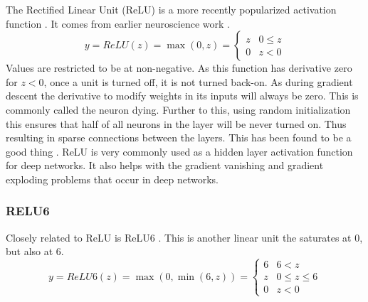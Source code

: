 \documentclass[12pt,parskip]{komatufte}
\begin{document}
The Rectified Linear Unit (ReLU) is a more recently popularized activation function .
It comes from earlier neuroscience work .
\begin{equation}
y=ReLU(z)=\max \left( 0, z \right)=\begin{cases}
z & 0\le z\\
0 & z<0
\end{cases}
\end{equation}
Values are restricted to be at non-negative.
As this function has derivative zero for $z<0$, once a unit is turned off, it is not turned back-on.
As during gradient descent the derivative to modify weights in its inputs will always be zero.
This is commonly called the neuron dying.
Further to this, using random initialization this ensures that half of all neurons in the layer will be never turned on.
Thus resulting in sparse connections between the layers.
This has been found to be a good thing .
ReLU is very commonly used as a hidden layer activation function for deep networks.
It also helps with the gradient vanishing and gradient exploding problems that occur in deep networks.


\subsubsection{RELU6}


Closely related to ReLU is ReLU6 .
This is another linear unit the saturates at 0, but also at 6.
\begin{equation}
y=ReLU6(z)=\max \left(0, \min\left(6, z\right) \right) =  \begin{cases}
6 & 6<z\\
z & 0\le z\le6\\
0 & z<0
\end{cases}
\end{equation}
\end{document}
